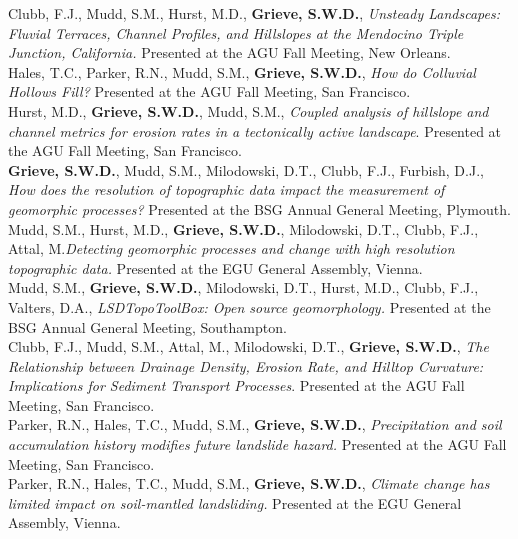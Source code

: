 \documentclass[10pt, a4paper]{article}
\newcommand{\years}[1]{\marginnote{\scriptsize #1}}
\begin{document}
\years{2017}Clubb, F.J., Mudd, S.M., Hurst, M.D., \textbf{Grieve, S.W.D.}, \textit{Unsteady Landscapes: Fluvial Terraces, Channel Profiles, and Hillslopes at the Mendocino Triple Junction, California.} Presented at the AGU Fall Meeting, New Orleans.\\[0.05cm]

\years{2016}Hales, T.C., Parker, R.N., Mudd, S.M., \textbf{Grieve, S.W.D.}, \textit{How do Colluvial Hollows Fill?} Presented at the AGU Fall Meeting, San Francisco.\\[0.05cm]

\years{2016}Hurst, M.D., \textbf{Grieve, S.W.D.}, Mudd, S.M., \textit{Coupled analysis of hillslope and channel metrics for erosion rates in a tectonically active landscape}. Presented at the AGU Fall Meeting, San Francisco.\\[0.05cm]

\years{2016}\textbf{Grieve, S.W.D.}, Mudd, S.M., Milodowski, D.T., Clubb, F.J., Furbish, D.J., \textit{How does the resolution of topographic data impact the measurement of geomorphic processes?} Presented at the BSG Annual General Meeting, Plymouth.\\[0.05cm]

\years{2016}Mudd, S.M., Hurst, M.D., \textbf{Grieve, S.W.D.}, Milodowski, D.T., Clubb, F.J., Attal, M.\textit{Detecting geomorphic processes and change with high resolution topographic data.} Presented at the EGU General Assembly, Vienna.\\[0.05cm]

\years{2015}Mudd, S.M., \textbf{Grieve, S.W.D.}, Milodowski, D.T., Hurst, M.D., Clubb, F.J., Valters, D.A., \textit{LSDTopoToolBox: Open source geomorphology.} Presented at the BSG Annual General Meeting, Southampton.\\[0.05cm]

\years{2015}Clubb, F.J., Mudd, S.M., Attal, M., Milodowski, D.T., \textbf{Grieve, S.W.D.}, \textit{The Relationship between Drainage Density, Erosion Rate, and Hilltop Curvature: Implications for Sediment Transport Processes}. Presented at the AGU Fall Meeting, San Francisco.\\[0.05cm]

\years{2015}Parker, R.N., Hales, T.C., Mudd, S.M., \textbf{Grieve, S.W.D.}, \textit{Precipitation and soil accumulation history modifies future landslide hazard.} Presented at the AGU Fall Meeting, San Francisco.\\[0.05cm]

\years{2015}Parker, R.N., Hales, T.C., Mudd, S.M., \textbf{Grieve, S.W.D.}, \textit{Climate change has limited impact on soil-mantled landsliding.} Presented at the EGU General Assembly, Vienna.\\[0.05cm]
\end{document}
